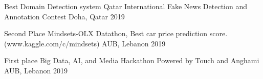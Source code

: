 



\begin{cvhonors}


  \cvhonor
    {Best Domain Detection system } %
    {Qatar International Fake News Detection and Annotation Contest} %
    {Doha, Qatar} %
    {2019} %

\end{cvhonors}




\begin{cvhonors}

  \cvhonor
    {Second Place} %
    {Mindsets-OLX Datathon, Best car price prediction score.(www.kaggle.com/c/mindsets)} %
    {AUB, Lebanon} %
    {2019} %

  \cvhonor
    {First place} %
    {Big Data, AI, and Media Hackathon Powered by Touch and Anghami} %
    {AUB, Lebanon} %
    {2019} %


\end{cvhonors}
